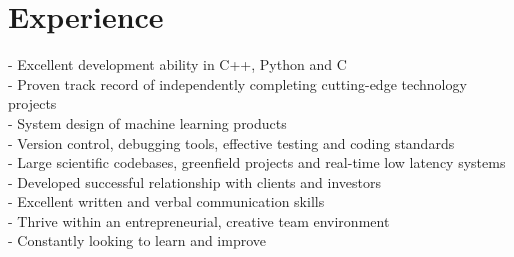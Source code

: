 \documentclass[print]{friggeri-cv} %
\begin{document}
\section{Experience}
- Excellent development ability in C++, Python and C\\
- Proven track record of independently completing cutting-edge technology projects\\
- System design of machine learning products\\
- Version control, debugging tools, effective testing and coding standards\\
- Large scientific codebases, greenfield projects and real-time low latency systems\\
- Developed successful relationship with clients and investors\\
- Excellent written and verbal communication skills\\
- Thrive within an entrepreneurial, creative team environment\\
- Constantly looking to learn and improve\\

\end{document}

